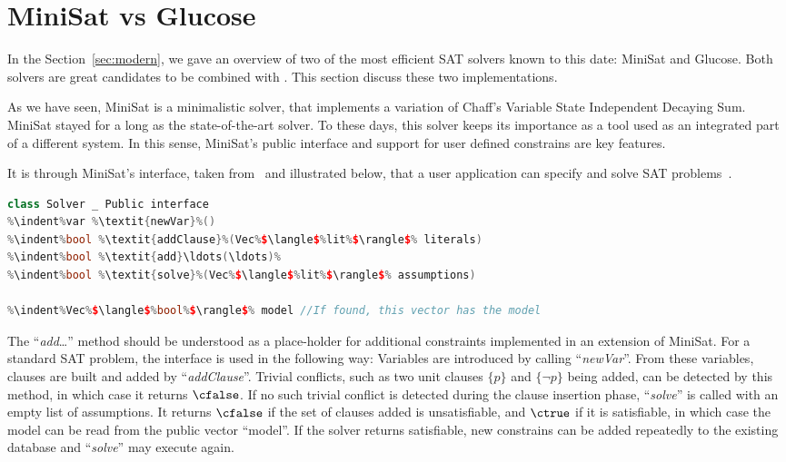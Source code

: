 
\section{MiniSat vs Glucose}
In the Section~\ref{sec:modern}, we gave an overview of two of the most
efficient SAT solvers known to this date: MiniSat and Glucose. Both solvers are
great candidates to be combined with \ksp. This section discuss these two
implementations. 

As we have seen, MiniSat is a minimalistic solver, that implements a variation
of Chaff's Variable State Independent Decaying Sum. MiniSat stayed for a long as
the state-of-the-art solver. To these days, this solver keeps its
importance as a tool used as an integrated part of a different system. In this
sense, MiniSat's public interface and support for user defined constrains are
key features.

It is through MiniSat's interface, taken from~\cite{een2003extensible} and
illustrated below, that a user application can specify and solve SAT
problems~\cite{een2003extensible}. 

\begin{lstlisting}[frame=single, language=C++,morekeywords={var,Solver,Vec,lit},escapechar=\%,
commentstyle=\color{gray}]
class Solver _ Public interface
%\indent%var %\textit{newVar}%()
%\indent%bool %\textit{addClause}%(Vec%$\langle$%lit%$\rangle$% literals)
%\indent%bool %\textit{add}\ldots(\ldots)%
%\indent%bool %\textit{solve}%(Vec%$\langle$%lit%$\rangle$% assumptions)

%\indent%Vec%$\langle$%bool%$\rangle$% model //If found, this vector has the model
\end{lstlisting}

The ``\textit{add}\ldots'' method should be understood as a place-holder for
additional constraints implemented in an extension of MiniSat. For a standard
SAT problem, the interface is used in the following way: Variables are
introduced by calling ``\textit{newVar}''. From these variables, clauses are
built and added by ``\textit{addClause}''.  Trivial conflicts, such as two unit
clauses $\{p\}$ and $\{\neg p\}$ being added, can be detected by this method, in
which case it returns $\cfalse$. If no such trivial conflict is detected during
the clause insertion phase, ``\textit{solve}'' is called with an empty list of
assumptions. It returns $\cfalse$ if the set of clauses added is unsatisfiable,
and $\ctrue$ if it is satisfiable, in which case the model can be read from the
public vector ``model''.  If the solver returns satisfiable, new constrains can
be added repeatedly to the existing database and ``\textit{solve}'' may execute again. 

